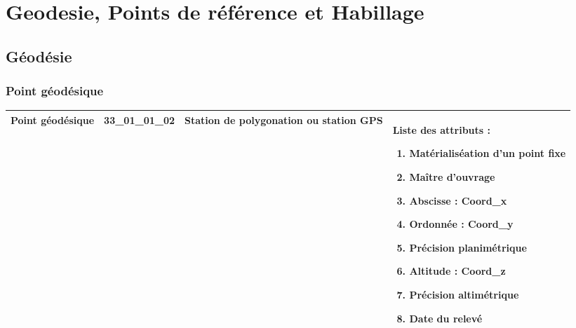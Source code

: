 \documentclass[12pt,titlepage]{book}
\begin{document}
\chapter{Geodesie, Points de référence et Habillage}
\section{\large Géodésie}
\subsection{Point géodésique}
\noindent
\vspace{\baselineskip}

\renewcommand{\arraystretch}{1.2}
\begin{supertabular}{|p{10cm}|c|p{13cm}|p{12cm}|}
 Point géodésique & 33\_01\_01\_02 & Station de polygonation ou station GPS & Liste des attributs :
\begin{enumerate}
  \item Matérialiséation d'un point fixe  \item Maître d'ouvrage  \item Abscisse : Coord\_x  \item Ordonnée : Coord\_y  \item Précision planimétrique  \item Altitude : Coord\_z  \item Précision altimétrique  \item Date du relevé\end{enumerate}
\\
\hline
\end{supertabular}
\end{document}
